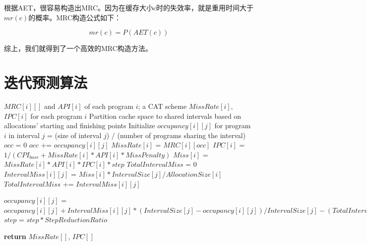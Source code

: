 根据AET，很容易构造出MRC。因为在缓存大小$c$时的失效率，就是重用时间大于$\textit{mr}(c)$的概率。MRC构造公式如下：

\begin{equation}
mr(c) = P(AET(c)) 
\label{eq:aet_mrr}
\end{equation}

综上，我们就得到了一个高效的MRC构造方法。


\section{迭代预测算法} \label{sec:prediction_iteration}


\begin{algorithm}
\caption{Prediction Algorithm}
\label{alg:pred}
\begin{algorithmic}[1]
\renewcommand{\algorithmicforall}{\textbf{foreach}}
\renewcommand{\algorithmicrequire}{\textbf{Input:}}
\renewcommand{\algorithmicensure}{\textbf{Output:}}
\REQUIRE $MRC[i][]$ and $API[i]$ of each program $i$; a CAT scheme
\ENSURE $MissRate[i]$, $IPC[i]$ for each program $i$
\STATE Partition cache space to shared intervals based on allocations' starting and finishing points
\STATE Initialize $occupancy[i][j]$ for program $i$ in interval $j$ = (size of interval $j$) / (number of programs sharing the interval)
    	\STATE $occ$ = $0$
			\STATE $occ$ += $occupancy[i][j]$
        \ENDFOR
        \STATE $MissRate[i]$ = $MRC[i][occ]$
        \STATE $IPC[i]$ = $1 / (CPI_{base} + MissRate[i] * API[i] * MissPenalty)$
        \STATE $Miss[i]$ = $MissRate[i] * API[i] * IPC[i] * step$
    \ENDFOR
    	\STATE $TotalIntervalMiss$ = $0$
        	\STATE $IntervalMiss[i][j]$ = $Miss[i] * IntervalSize[j] / AllocationSize[i]$
            \STATE $TotalIntervalMiss$ += $IntervalMiss[i][j]$ 
		\ENDFOR
        
        	\STATE $occupancy[i][j]$ =  $occupancy[i][j] + IntervalMiss[i][j] * (IntervalSize[j] - occupancy[i][j]) / IntervalSize[j] - (TotalIntervalMiss - IntervalMiss[i][j]) * occupancy[i][j] / IntervalSize[j]$
		\ENDFOR
    \ENDFOR
    	\STATE $step$ = $step * StepReductionRatio$
    \ENDIF
\ENDWHILE

\STATE \textbf{return} $MissRate[]$, $IPC[]$

\end{algorithmic}
\end{algorithm}